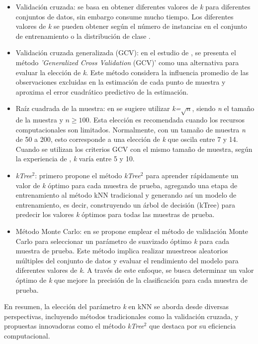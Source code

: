 \begin{itemize}
	\item Validación cruzada: se basa en obtener diferentes valores de \textit{k} para diferentes conjuntos de datos, sin embargo consume mucho tiempo. Los diferentes valores de \textit{k} se pueden obtener según el número de instancias en el conjunto de entrenamiento o la distribución de clase \citep{zhang2017efficient}.
	\item Validación cruzada generalizada (GCV): en el estudio de \citep{wahba1975smoothing}, se presenta el método \textit{'Generalized Cross Validation} (GCV)' como una alternativa para evaluar la elección de \textit{k}. Este método considera la influencia promedio de las observaciones excluidas en la estimación de cada punto de muestra y aproxima el error cuadrático predictivo de la estimación. 
	\item Raíz cuadrada de la muestra: en \citep{lall1996nearest} se sugiere utilizar \textit{k=}$\sqrt{n}$, siendo \textit{n} el tamaño de la muestra y $n\geq100$. Esta elección es recomendada cuando los recursos computacionales son limitados. Normalmente, con un tamaño de muestra \textit{n} de 50 a 200, esto corresponde a una elección de \textit{k} que oscila entre 7 y 14. Cuando se utilizan los criterios GCV con el mismo tamaño de muestra, según la experiencia de \citep{lall1996nearest}, \textit{k} varía entre 5 y 10. 
	\item \textit{kTree}$^{2}$: \citep{zhang2014predicting} primero propone el método \textit{kTree}$^{2}$ para aprender rápidamente un valor de \textit{k} óptimo para cada muestra de prueba, agregando una etapa de entrenamiento al método kNN tradicional y generando así un modelo de entrenamiento, es decir, construyendo un árbol de decisión (kTree) para predecir los valores \textit{k} óptimos para todas las muestras de prueba.
	\item Método Monte Carlo: en \citep{zhang2017efficient} se propone emplear el método de validación Monte Carlo para seleccionar un parámetro de suavizado óptimo \textit{k} para cada muestra de prueba. Este método implica realizar muestreos aleatorios múltiples del conjunto de datos y evaluar el rendimiento del modelo para diferentes valores de \textit{k}. A través de este enfoque, se busca determinar un valor óptimo de \textit{k} que mejore la precisión de la clasificación para cada muestra de prueba. 
\end{itemize}
En resumen, la elección del parámetro \textit{k} en kNN se aborda desde diversas perspectivas, incluyendo métodos tradicionales como la validación cruzada, y propuestas innovadoras como el método \textit{kTree}$^{2}$ que destaca por su eficiencia computacional. \\
